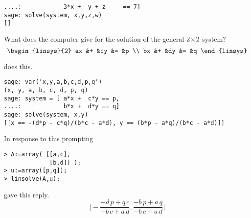\begin{exercises}
\begin{answer}
\begin{exparts}
\begin{lstlisting}
....:            3*x +  y + z     == 7]
sage: solve(system, x,y,z,w)
[]          
\end{lstlisting}
      \end{exparts}
    \end{answer}
  \item 
    What does the computer give for the solution of the general
    $2 \! \times \! 2$  system?
    \begin{equation*}
      \begin{linsys}{2}
        ax  &+  &cy  &=  &p  \\
        bx  &+  &dy  &=  &q
      \end{linsys}
    \end{equation*}
    \begin{answer}
      \Sage{} does this.
\begin{lstlisting}
sage: var('x,y,a,b,c,d,p,q')
(x, y, a, b, c, d, p, q)
sage: system = [ a*x +  c*y == p,
....:            b*x +  d*y == q]
sage: solve(system, x,y)
[[x == -(d*p - c*q)/(b*c - a*d), y == (b*p - a*q)/(b*c - a*d)]]        
\end{lstlisting}
       In response to this prompting
\begin{lstlisting}
> A:=array( [[a,c],
             [b,d]] );
> u:=array([p,q]);
> linsolve(A,u);
\end{lstlisting}
      \Maple{} gave this reply.
      \begin{equation*}
        \bigl[-\frac{-d\,p+q\,c}{-b\,c+a\,d},
          \frac{-b\,p+a\,q}{-b\,c+a\,d}\bigr]
      \end{equation*}
    \end{answer}
\end{exercises}
\endinput


